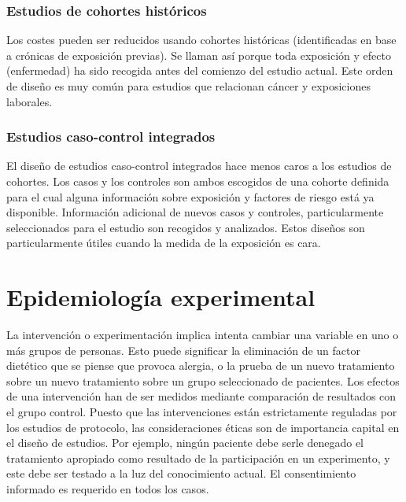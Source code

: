 \subsubsection{Estudios de cohortes históricos}
Los costes pueden ser reducidos usando cohortes históricas (identificadas en base a crónicas de exposición previas). Se llaman así porque toda exposición y efecto (enfermedad) ha sido recogida antes del comienzo del estudio actual. Este orden de diseño es muy común para estudios que relacionan cáncer y exposiciones laborales.
\subsubsection{Estudios caso-control integrados}
El diseño de estudios caso-control integrados hace menos caros a los estudios de cohortes. Los casos y los controles son ambos escogidos de una cohorte definida para el cual alguna información sobre exposición y factores de riesgo está ya disponible. Información adicional de nuevos casos y controles, particularmente seleccionados para el estudio son recogidos y analizados. Estos diseños son particularmente útiles cuando la medida de la exposición es cara.
\section{Epidemiología experimental}
La intervención o experimentación implica intenta cambiar una variable en uno o más grupos de personas. Esto puede significar la eliminación de un factor dietético que se piense que provoca alergia, o la prueba de un nuevo tratamiento sobre un nuevo tratamiento sobre un grupo seleccionado de pacientes. Los efectos de una intervención han de ser medidos mediante comparación de resultados con el grupo control. Puesto que las intervenciones están estrictamente reguladas por los estudios de protocolo, las consideraciones éticas son de importancia capital en el diseño de estudios. Por ejemplo, ningún paciente debe serle denegado el tratamiento apropiado como resultado de la participación en un experimento, y este debe ser testado a la luz del conocimiento actual. El consentimiento informado es requerido en todos los casos.

